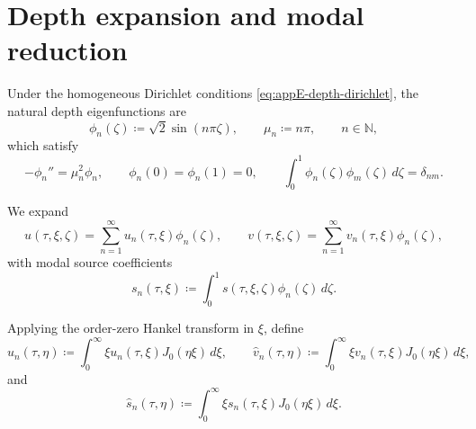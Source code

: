 \section{Depth expansion and modal reduction}
\label{sec:appE-depth-expansion}

Under the homogeneous Dirichlet conditions
\eqref{eq:appE-depth-dirichlet}, the natural depth eigenfunctions are
\begin{equation}
    \phi_n(\zeta)\coloneqq \sqrt{2}\sin(n\pi\zeta),
    \qquad
    \mu_n\coloneqq n\pi,
    \qquad
    n\in\mathbb{N},
    \label{eq:appE-depth-basis}
\end{equation}
which satisfy
\[
    -\phi_n''=\mu_n^2\phi_n,
    \qquad
    \phi_n(0)=\phi_n(1)=0,
    \qquad
    \int_0^1 \phi_n(\zeta)\phi_m(\zeta)\, d\zeta=\delta_{nm}.
\]

We expand
\begin{equation}
    u(\tau,\xi,\zeta)
    =
    \sum_{n=1}^{\infty} u_n(\tau,\xi)\phi_n(\zeta),
    \qquad
    v(\tau,\xi,\zeta)
    =
    \sum_{n=1}^{\infty} v_n(\tau,\xi)\phi_n(\zeta),
    \label{eq:appE-depth-expansion}
\end{equation}
with modal source coefficients
\begin{equation}
    s_n(\tau,\xi)
    \coloneqq
    \int_0^1 s(\tau,\xi,\zeta)\phi_n(\zeta)\, d\zeta.
    \label{eq:appE-source-depth-coeff}
\end{equation}

Applying the order-zero Hankel transform in \(\xi\), define
\begin{equation}
    \widehat{u}_n(\tau,\eta)
    \coloneqq
    \int_0^\infty \xi u_n(\tau,\xi)J_0(\eta\xi)\, d\xi,
    \qquad
    \widehat{v}_n(\tau,\eta)
    \coloneqq
    \int_0^\infty \xi v_n(\tau,\xi)J_0(\eta\xi)\, d\xi,
    \label{eq:appE-modal-hankel-coeffs}
\end{equation}
and
\begin{equation}
    \widehat{s}_n(\tau,\eta)
    \coloneqq
    \int_0^\infty \xi s_n(\tau,\xi)J_0(\eta\xi)\, d\xi.
    \label{eq:appE-modal-source-hankel}
\end{equation}

